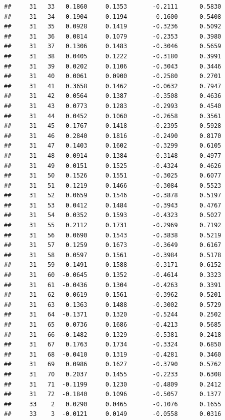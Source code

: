 \documentclass[
]{article}
\begin{document}
\begin{verbatim}
##     31   33   0.1860     0.1353       -0.2111      0.5830  
##     31   34   0.1904     0.1194       -0.1600      0.5408  
##     31   35   0.0928     0.1419       -0.3236      0.5092  
##     31   36   0.0814     0.1079       -0.2353      0.3980  
##     31   37   0.1306     0.1483       -0.3046      0.5659  
##     31   38   0.0405     0.1222       -0.3180      0.3991  
##     31   39   0.0202     0.1106       -0.3043      0.3446  
##     31   40   0.0061     0.0900       -0.2580      0.2701  
##     31   41   0.3658     0.1462       -0.0632      0.7947  
##     31   42   0.0564     0.1387       -0.3508      0.4636  
##     31   43   0.0773     0.1283       -0.2993      0.4540  
##     31   44   0.0452     0.1060       -0.2658      0.3561  
##     31   45   0.1767     0.1418       -0.2395      0.5928  
##     31   46   0.2840     0.1816       -0.2490      0.8170  
##     31   47   0.1403     0.1602       -0.3299      0.6105  
##     31   48   0.0914     0.1384       -0.3148      0.4977  
##     31   49   0.0151     0.1525       -0.4324      0.4626  
##     31   50   0.1526     0.1551       -0.3025      0.6077  
##     31   51   0.1219     0.1466       -0.3084      0.5523  
##     31   52   0.0659     0.1546       -0.3878      0.5197  
##     31   53   0.0412     0.1484       -0.3943      0.4767  
##     31   54   0.0352     0.1593       -0.4323      0.5027  
##     31   55   0.2112     0.1731       -0.2969      0.7192  
##     31   56   0.0690     0.1543       -0.3838      0.5219  
##     31   57   0.1259     0.1673       -0.3649      0.6167  
##     31   58   0.0597     0.1561       -0.3984      0.5178  
##     31   59   0.1491     0.1588       -0.3171      0.6152  
##     31   60  -0.0645     0.1352       -0.4614      0.3323  
##     31   61  -0.0436     0.1304       -0.4263      0.3391  
##     31   62   0.0619     0.1561       -0.3962      0.5201  
##     31   63   0.1363     0.1488       -0.3002      0.5729  
##     31   64  -0.1371     0.1320       -0.5244      0.2502  
##     31   65   0.0736     0.1686       -0.4213      0.5685  
##     31   66  -0.1482     0.1329       -0.5381      0.2418  
##     31   67   0.1763     0.1734       -0.3324      0.6850  
##     31   68  -0.0410     0.1319       -0.4281      0.3460  
##     31   69   0.0986     0.1627       -0.3790      0.5762  
##     31   70   0.2037     0.1455       -0.2233      0.6308  
##     31   71  -0.1199     0.1230       -0.4809      0.2412  
##     31   72  -0.1840     0.1096       -0.5057      0.1377  
##     33    2   0.0290     0.0465       -0.1076      0.1655  
##     33    3  -0.0121     0.0149       -0.0558      0.0316  

\end{verbatim}
\end{document}

